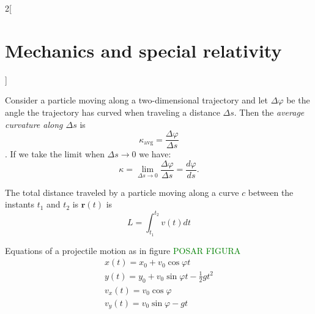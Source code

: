 \documentclass[../../../main.tex]{subfiles}
\begin{document}
\begin{multicols}{2}[\section{Mechanics and special relativity}]
\begin{concept}
\end{concept}
\begin{concept}
Consider a particle moving along a two-dimensional trajectory and let $\Delta\varphi$ be the angle the trajectory has curved when traveling a distance $\Delta s$. Then the \textit{average curvature along $\Delta s$} is $$\kappa_\text{avg}=\frac{\Delta \varphi}{\Delta s}$$. If we take the limit when $\Delta s\to 0$ we have: $$\kappa=\lim_{\Delta s\to 0}\frac{\Delta \varphi}{\Delta s}=\frac{d\varphi}{ds}.$$
\end{concept}
\begin{concept}
The total distance traveled by a particle moving along a curve $c$ between the instants $t_1$ and $t_2$ is $\boldsymbol{r}(t)$ is $$L=\int_{t_1}^{t_2}v(t)dt$$
\end{concept}
\begin{concept}
Equations of a projectile motion as in figure \textcolor{green}{POSAR FIGURA}
\begin{gather*}
    x(t)=x_0+v_0\cos\varphi t\\
    y(t)=y_0+v_0\sin\varphi t-\frac{1}{2}gt^2\\
    v_x(t)=v_0\cos\varphi\\
    v_y(t)=v_0\sin\varphi-gt
\end{gather*}
\end{concept}

\end{multicols}
\end{document}
